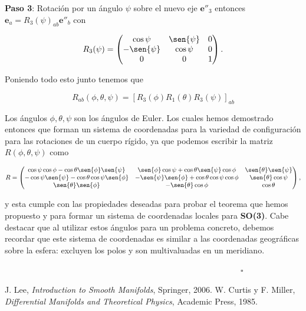 \documentclass[a4paper,10pt]{article}
\numberwithin{equation}{section}
\begin{document}
\textbf{Paso 3}: Rotación por un ángulo $\psi$ sobre el nuevo eje $\mathbf{e}''_3$ 
entonces $\mathbf{e}_a = R_3(\psi)_{ab}\mathbf{e}''_b$ con 

\begin{equation}
 R_3(\psi) = \begin{pmatrix}
              \cos{\psi} & \sen{\psi} & 0 \\
	      -\sen{\psi} & \cos{\psi} & 0 \\
	      0 & 0 & 1
	     \end{pmatrix}.
\end{equation}

Poniendo todo esto junto tenemos que 

\begin{equation}
 R_{ab} (\phi,\theta,\psi) = [R_3(\phi)R_1(\theta)R_3(\psi)]_{ab}
\end{equation}

Los ángulos $\phi,\theta,\psi$ son los ángulos de Euler. Los cuales hemos demostrado 
entonces que forman un sistema de coordenadas para la variedad de configuración 
para las rotaciones de un cuerpo rígido, ya que podemos escribir la matriz $R(\phi,\theta,\psi)$
como 

\begin{equation*}
 R  = \begin{pmatrix}
              \cos{\psi}\cos{\phi} - \cos{\theta}\sen{\phi}\sen{\psi} & 
              \sen{\phi}\cos{\psi} + \cos{\theta}\sen{\psi}\cos{\phi} & 
              \sen{\theta}\sen{\psi} \\
	      -\cos{\psi}\sen{\psi} - \cos{\theta}\cos{\psi}\sen{\phi} & 
	      -\sen{\psi}\sen{\phi} + \cos{\theta}\cos{\psi}\cos{\phi} & 
	      \sen{\theta}\cos{\psi} \\
	      \sen{\theta}\sen{\phi} & -\sen{\theta}\cos{\phi} & \cos{\theta}
	     \end{pmatrix},
\end{equation*}

y esta cumple con las propiedades deseadas para probar el teorema que hemos propuesto 
y para formar un sistema de coordenadas locales para \textbf{SO(3)}. Cabe destacar 
que al utilizar estos ángulos para un problema concreto, debemos recordar que este 
sistema de coordenadas es similar a las coordenadas geográficas sobre la esfera: excluyen 
los polos y son multivaluadas en un meridiano.

$\hspace{12cm} \square$

\begin{thebibliography}{10}
J. Lee, \emph{Introduction to Smooth Manifolds}, Springer, 2006.
W. Curtis y F. Miller, \emph{Differential Manifolds and Theoretical Physics}, Academic 
Press, 1985.
\end{thebibliography}
\end{document}
